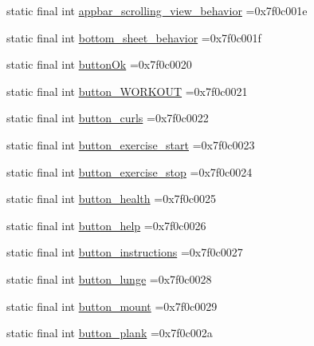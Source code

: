 \begin{DoxyCompactItemize}
static final int \mbox{\hyperlink{classcom_1_1example_1_1trainawearapplication_1_1_r_1_1string_a73c7b247f934a1d2577d4a9dbd1b6804}{appbar\+\_\+scrolling\+\_\+view\+\_\+behavior}} =0x7f0c001e
\item 
static final int \mbox{\hyperlink{classcom_1_1example_1_1trainawearapplication_1_1_r_1_1string_a92c0cf1afb25d40e45f8a1bcec72e926}{bottom\+\_\+sheet\+\_\+behavior}} =0x7f0c001f
\item 
static final int \mbox{\hyperlink{classcom_1_1example_1_1trainawearapplication_1_1_r_1_1string_a204580e05395d11a8314cc244ce2ebd3}{button\+Ok}} =0x7f0c0020
\item 
static final int \mbox{\hyperlink{classcom_1_1example_1_1trainawearapplication_1_1_r_1_1string_a1d4b501d256987ba941cd742cb3bba10}{button\+\_\+\+W\+O\+R\+K\+O\+UT}} =0x7f0c0021
\item 
static final int \mbox{\hyperlink{classcom_1_1example_1_1trainawearapplication_1_1_r_1_1string_a5e6bf36ebea69137793fa98b3c3ce270}{button\+\_\+curls}} =0x7f0c0022
\item 
static final int \mbox{\hyperlink{classcom_1_1example_1_1trainawearapplication_1_1_r_1_1string_aa564469757408002b8a8e8da6b808e70}{button\+\_\+exercise\+\_\+start}} =0x7f0c0023
\item 
static final int \mbox{\hyperlink{classcom_1_1example_1_1trainawearapplication_1_1_r_1_1string_a63b149373ecc9c5a65335109d30ce0e6}{button\+\_\+exercise\+\_\+stop}} =0x7f0c0024
\item 
static final int \mbox{\hyperlink{classcom_1_1example_1_1trainawearapplication_1_1_r_1_1string_a9c389b0b87140d27ddc4a2185e2f37c1}{button\+\_\+health}} =0x7f0c0025
\item 
static final int \mbox{\hyperlink{classcom_1_1example_1_1trainawearapplication_1_1_r_1_1string_a2654414781858bd2289ec7669a7b593a}{button\+\_\+help}} =0x7f0c0026
\item 
static final int \mbox{\hyperlink{classcom_1_1example_1_1trainawearapplication_1_1_r_1_1string_aa5de49063be5b8eb7a5f2a043123dfdb}{button\+\_\+instructions}} =0x7f0c0027
\item 
static final int \mbox{\hyperlink{classcom_1_1example_1_1trainawearapplication_1_1_r_1_1string_a4fe7cb49c216081c7a03c1c9b2f7dc2b}{button\+\_\+lunge}} =0x7f0c0028
\item 
static final int \mbox{\hyperlink{classcom_1_1example_1_1trainawearapplication_1_1_r_1_1string_abd9eed987cc97db6e50aff667ffafece}{button\+\_\+mount}} =0x7f0c0029
\item 
static final int \mbox{\hyperlink{classcom_1_1example_1_1trainawearapplication_1_1_r_1_1string_af2b5ce6f9b4ede2671cb447d173f4fef}{button\+\_\+plank}} =0x7f0c002a

\end{DoxyCompactItemize}

